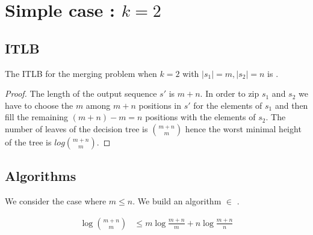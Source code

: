 \section{Simple case : $k=2$}
\label{tree:merging:k=2}

\subsection{ITLB}
\label{tree:merging:k=2:ITLB}


\begin{theorem}
The ITLB for the merging problem when $k = 2$ with $|s_1| = m, |s_2| = n$ is .
\end{theorem}

\begin{proof}
The length of the output sequence $s'$ is $m+n$. In order to zip $s_1$ and $s_2$ we have to choose the $m$ among $m+n$ positions in $s'$ for the elements of $s_1$ and then fill the remaining $(m+n) - m = n$ positions with the elements of $s_2$. The number of leaves of the decision tree is $\binom{m+n}{m}$ hence the worst minimal height of the tree is $log \binom{m+n}{m}$.
\end{proof}



\subsection{Algorithms}
\label{tree:merging:k=2:alg}

We consider the case where $m \leq n$. We build an algorithm $\in$ .

\begin{lemma}
\begin{align*}
\log\binom{m+n}{m} &\leq m \log\frac{m+n}{m} + n \log\frac{m+n}{n}\\
\end{align*}
\end{lemma}

